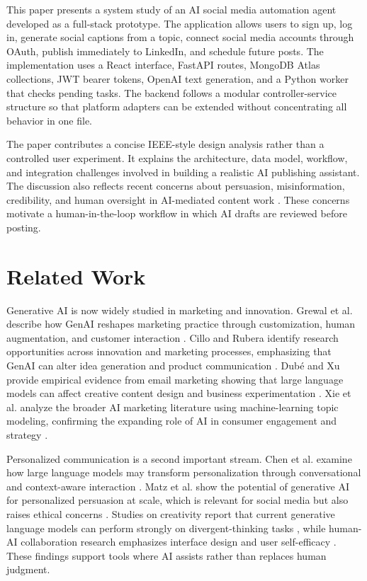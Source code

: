 \documentclass[conference]{IEEEtran}
\begin{document}
This paper presents a system study of an AI social media automation agent developed as a full-stack prototype. The application allows users to sign up, log in, generate social captions from a topic, connect social media accounts through OAuth, publish immediately to LinkedIn, and schedule future posts. The implementation uses a React interface, FastAPI routes, MongoDB Atlas collections, JWT bearer tokens, OpenAI text generation, and a Python worker that checks pending tasks. The backend follows a modular controller-service structure so that platform adapters can be extended without concentrating all behavior in one file.

The paper contributes a concise IEEE-style design analysis rather than a controlled user experiment. It explains the architecture, data model, workflow, and integration challenges involved in building a realistic AI publishing assistant. The discussion also reflects recent concerns about persuasion, misinformation, credibility, and human oversight in AI-mediated content work \cite{matz2024,hoes2024,ahmad2024}. These concerns motivate a human-in-the-loop workflow in which AI drafts are reviewed before posting.

\section{Related Work}
Generative AI is now widely studied in marketing and innovation. Grewal et al. describe how GenAI reshapes marketing practice through customization, human augmentation, and customer interaction \cite{grewal2025}. Cillo and Rubera identify research opportunities across innovation and marketing processes, emphasizing that GenAI can alter idea generation and product communication \cite{cillo2025}. Dubé and Xu provide empirical evidence from email marketing showing that large language models can affect creative content design and business experimentation \cite{dube2026}. Xie et al. analyze the broader AI marketing literature using machine-learning topic modeling, confirming the expanding role of AI in consumer engagement and strategy \cite{xie2025}.

Personalized communication is a second important stream. Chen et al. examine how large language models may transform personalization through conversational and context-aware interaction \cite{chen2024}. Matz et al. show the potential of generative AI for personalized persuasion at scale, which is relevant for social media but also raises ethical concerns \cite{matz2024}. Studies on creativity report that current generative language models can perform strongly on divergent-thinking tasks \cite{hubert2024}, while human-AI collaboration research emphasizes interface design and user self-efficacy \cite{mcguire2024}. These findings support tools where AI assists rather than replaces human judgment.
\end{document}
